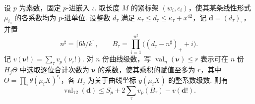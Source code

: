 \begin{lemma}[十二份曲线级数的赋值估计]
\label{lem:c-derivative-valuation}
\emitthmsource
设 $p$ 为素数，固定 $p$-进嵌入 $\iota$. 取长度 $M$ 的紧标架 $(w_i,c_i)$，使其某条线性形式 $\mu_{i_0}$ 的各系数均为 $p$-进单位. 设整数 $d_\tau$ 满足 $\kappa_\tau\le d_\tau\le\kappa_\tau+x^{42}$，记 $\boldsymbol d=(d_\tau)_\tau$，并置
\[
 n^\sharp=\lceil6b/k\rceil,\qquad
 B_\tau=\prod_{i=1}^{n^\sharp}\bigl((d_\tau-n^\sharp)_++i\bigr).
\]
记 $v(\boldsymbol\nu!)=\sum_\tau v_p(\nu_\tau!)$. 对 $n$ 份曲线级数，写 $\operatorname{val}_n(\boldsymbol\nu)\le r$ 表示可在 $n$ 份 $H_j\Theta$ 中选取逐位合计次数为 $\boldsymbol\nu$ 的系数，使其乘积的赋值至多为 $r$，其中 $\Theta=\prod_i\theta(\mu_i X)^{c_i}$，各 $H_j$ 为关于曲线坐标 $y(\mu_i X)$ 的整系数级数. 则有
\[
 \operatorname{val}_{12}(\boldsymbol d)
 \le S_p+2\sum_\tau v_p(B_\tau)-v(\boldsymbol d!).
\]
\end{lemma}


